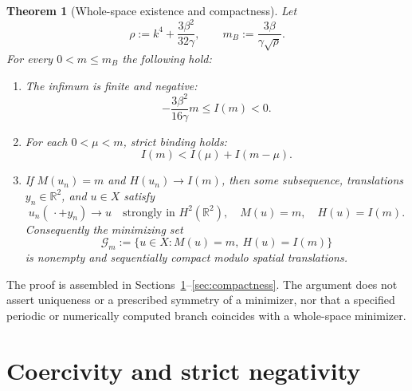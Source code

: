 \documentclass[11pt]{article}
\numberwithin{equation}{section}
\newtheorem{theorem}{Theorem}[section]
\theoremstyle{remark}
\newcommand{\R}{\mathbb{R}}
\newcommand{\calG}{\mathcal{G}}
\begin{document}
\begin{theorem}[Whole-space existence and compactness]\label{thm:main}
Let
\begin{equation}\label{eq:threshold}
\rho:=k^4+\frac{3\beta^2}{32\gamma},
\qquad m_B:=\frac{3\beta}{\gamma\sqrt{\rho}}.
\end{equation}
For every $0<m\le m_B$ the following hold:
\begin{enumerate}[label=\textup{(\roman*)}]
\item The infimum is finite and negative:
\begin{equation}\label{eq:negative}
-\frac{3\beta^2}{16\gamma}m\le I(m)<0.
\end{equation}
\item For each $0<\mu<m$, strict binding holds:
\begin{equation}\label{eq:binding}
I(m)<I(\mu)+I(m-\mu).
\end{equation}
\item If $M(u_n)=m$ and $H(u_n)\to I(m)$, then some subsequence,
translations $y_n\in\R^2$, and $u\in X$ satisfy
\begin{equation}\label{eq:compact}
u_n(\,\cdot+y_n)\longrightarrow u\quad\text{strongly in }H^2(\R^2),
\quad M(u)=m,\quad H(u)=I(m).
\end{equation}
Consequently the minimizing set
\[
\calG_m:=\{u\in X:M(u)=m,\ H(u)=I(m)\}
\]
is nonempty and sequentially compact modulo spatial translations.
\end{enumerate}
\end{theorem}

The proof is assembled in Sections~\ref{sec:coercivity}--\ref{sec:compactness}.
The argument does not assert uniqueness or a prescribed symmetry of a
minimizer, nor that a specified periodic or numerically computed branch
coincides with a whole-space minimizer.

\section{Coercivity and strict negativity}\label{sec:coercivity}
\end{document}
